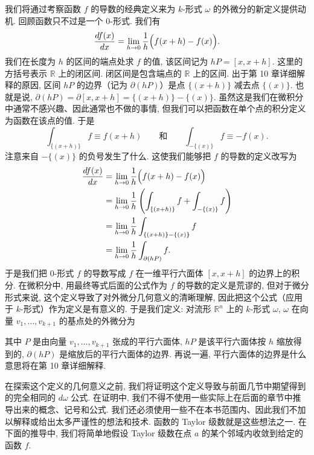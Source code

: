我们将通过考察函数 $f$ 的导数的经典定义来为 $k$-形式 $\omega$ 的外微分的新定义提供动机. 回顾函数只不过是一个 0-形式. 我们有
\[
\frac{df(x)}{dx}=\lim_{h\to 0}\frac{1}{h}\Bigl(f(x+h)-f(x)\Bigr).
\]
我们在长度为 $h$ 的区间的端点处求 $f$ 的值, 该区间记为 $hP=[x,x+h]$. 这里的方括号表示 $\mathbb{R}$ 上的闭区间. 闭区间是包含端点的 $\mathbb{R}$ 上的区间. 出于第 10 章详细解释的原因, 区间 $hP$ 的边界（记为 $\partial(hP)$）是点 $\{(x+h)\}$ 减去点 $\{(x)\}$. 也就是说, $\partial(hP)=\partial[x,x+h]=\{(x+h)\}-\{(x)\}$. 虽然这是我们在微积分中通常不感兴趣、因此通常也不做的事情, 但我们可以把函数在单个点的积分定义为函数在该点的值. 于是
\[
\int_{\{(x+h)\}}f\equiv f(x+h)\qquad\text{和}\qquad
\int_{-\{(x)\}}f\equiv -f(x).
\]
注意来自 $-\{(x)\}$ 的负号发生了什么. 这使我们能够把 $f$ 的导数的定义改写为
\begin{align*}
\frac{df(x)}{dx}&=\lim_{h\to 0}\frac{1}{h}\Bigl(f(x+h)-f(x)\Bigr)\\
&=\lim_{h\to 0}\frac{1}{h}\left(\int_{\{(x+h)\}}f+\int_{-\{(x)\}}f\right)\\
&=\lim_{h\to 0}\frac{1}{h}\int_{\{(x+h)\}-\{(x)\}}f\\
&=\lim_{h\to 0}\frac{1}{h}\int_{\partial(hP)}f.
\end{align*}
于是我们把 0-形式 $f$ 的导数写成 $f$ 在一维平行六面体 $[x,x+h]$ 的边界上的积分. 在微积分中, 用最终等式后面的公式作为 $f$ 的导数的定义是荒谬的, 但对于微分形式来说, 这个定义导致了对外微分几何意义的清晰理解, 因此把这个公式（应用于 $k$-形式）作为定义是有意义的. 于是我们定义: 对流形 $\mathbb{R}^n$ 上的 $k$-形式 $\omega$, $\omega$ 在向量 $v_1,\ldots,v_{k+1}$ 的基点处的外微分为
\begin{center}
\end{center}
其中 $P$ 是由向量 $v_1,\ldots,v_{k+1}$ 张成的平行六面体, $hP$ 是该平行六面体按 $h$ 缩放得到的, $\partial(hP)$ 是缩放后的平行六面体的边界. 再说一遍, 平行六面体的边界是什么意思将在第 10 章详细解释.

在探索这个定义的几何意义之前, 我们将证明这个定义导致与前面几节中期望得到的完全相同的 $d\omega$ 公式. 在证明中, 我们不得不使用一些实际上在后面的章节中推导出来的概念、记号和公式. 我们还必须使用一些不在本书范围内、因此我们不加以解释或给出太多严谨性的想法和技术. 函数的 Taylor 级数就是这些想法之一. 在下面的推导中, 我们将简单地假设 Taylor 级数在点 $a$ 的某个邻域内收敛到给定的函数 $f$.

